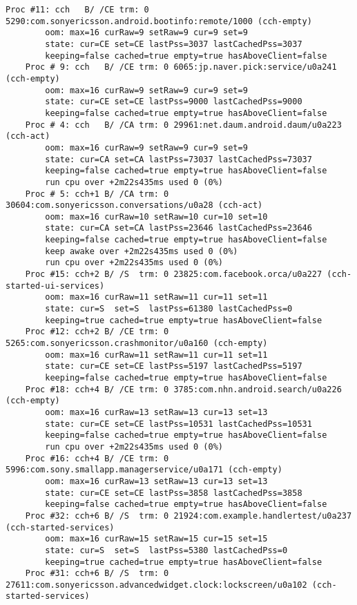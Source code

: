 \begin{lstlisting}[frame=single]
    Proc #11: cch   B/ /CE trm: 0 5290:com.sonyericsson.android.bootinfo:remote/1000 (cch-empty)
        oom: max=16 curRaw=9 setRaw=9 cur=9 set=9
        state: cur=CE set=CE lastPss=3037 lastCachedPss=3037
        keeping=false cached=true empty=true hasAboveClient=false
    Proc # 9: cch   B/ /CE trm: 0 6065:jp.naver.pick:service/u0a241 (cch-empty)
        oom: max=16 curRaw=9 setRaw=9 cur=9 set=9
        state: cur=CE set=CE lastPss=9000 lastCachedPss=9000
        keeping=false cached=true empty=true hasAboveClient=false
    Proc # 4: cch   B/ /CA trm: 0 29961:net.daum.android.daum/u0a223 (cch-act)
        oom: max=16 curRaw=9 setRaw=9 cur=9 set=9
        state: cur=CA set=CA lastPss=73037 lastCachedPss=73037
        keeping=false cached=true empty=true hasAboveClient=false
        run cpu over +2m22s435ms used 0 (0%)
    Proc # 5: cch+1 B/ /CA trm: 0 30604:com.sonyericsson.conversations/u0a28 (cch-act)
        oom: max=16 curRaw=10 setRaw=10 cur=10 set=10
        state: cur=CA set=CA lastPss=23646 lastCachedPss=23646
        keeping=false cached=true empty=true hasAboveClient=false
        keep awake over +2m22s435ms used 0 (0%)
        run cpu over +2m22s435ms used 0 (0%)
    Proc #15: cch+2 B/ /S  trm: 0 23825:com.facebook.orca/u0a227 (cch-started-ui-services)
        oom: max=16 curRaw=11 setRaw=11 cur=11 set=11
        state: cur=S  set=S  lastPss=61380 lastCachedPss=0
        keeping=true cached=true empty=true hasAboveClient=false
    Proc #12: cch+2 B/ /CE trm: 0 5265:com.sonyericsson.crashmonitor/u0a160 (cch-empty)
        oom: max=16 curRaw=11 setRaw=11 cur=11 set=11
        state: cur=CE set=CE lastPss=5197 lastCachedPss=5197
        keeping=false cached=true empty=true hasAboveClient=false
    Proc #18: cch+4 B/ /CE trm: 0 3785:com.nhn.android.search/u0a226 (cch-empty)
        oom: max=16 curRaw=13 setRaw=13 cur=13 set=13
        state: cur=CE set=CE lastPss=10531 lastCachedPss=10531
        keeping=false cached=true empty=true hasAboveClient=false
        run cpu over +2m22s435ms used 0 (0%)
    Proc #16: cch+4 B/ /CE trm: 0 5996:com.sony.smallapp.managerservice/u0a171 (cch-empty)
        oom: max=16 curRaw=13 setRaw=13 cur=13 set=13
        state: cur=CE set=CE lastPss=3858 lastCachedPss=3858
        keeping=false cached=true empty=true hasAboveClient=false
    Proc #32: cch+6 B/ /S  trm: 0 21924:com.example.handlertest/u0a237 (cch-started-services)
        oom: max=16 curRaw=15 setRaw=15 cur=15 set=15
        state: cur=S  set=S  lastPss=5380 lastCachedPss=0
        keeping=true cached=true empty=true hasAboveClient=false
    Proc #31: cch+6 B/ /S  trm: 0 27611:com.sonyericsson.advancedwidget.clock:lockscreen/u0a102 (cch-started-services)

\end{lstlisting}
